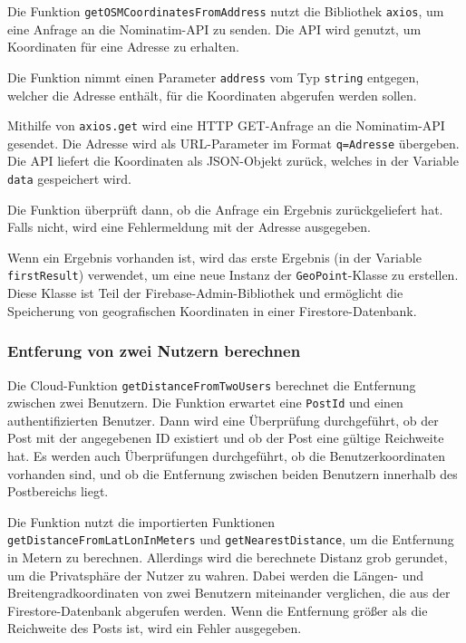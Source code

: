 Die Funktion \texttt{getOSMCoordinatesFromAddress} nutzt die Bibliothek \texttt{axios}, um eine Anfrage an die Nominatim-API zu senden. Die API wird genutzt, um Koordinaten für eine Adresse zu erhalten.

Die Funktion nimmt einen Parameter \texttt{address} vom Typ \texttt{string} entgegen, welcher die Adresse enthält, für die Koordinaten abgerufen werden sollen.

Mithilfe von \texttt{axios.get} wird eine HTTP GET-Anfrage an die Nominatim-API gesendet. Die Adresse wird als URL-Parameter im Format \texttt{q=Adresse} übergeben. Die API liefert die Koordinaten als JSON-Objekt zurück, welches in der Variable \texttt{data} gespeichert wird.

Die Funktion überprüft dann, ob die Anfrage ein Ergebnis zurückgeliefert hat. Falls nicht, wird eine Fehlermeldung mit der Adresse ausgegeben.

Wenn ein Ergebnis vorhanden ist, wird das erste Ergebnis (in der Variable \texttt{firstResult}) verwendet, um eine neue Instanz der \texttt{GeoPoint}-Klasse zu erstellen. Diese Klasse ist Teil der Firebase-Admin-Bibliothek und ermöglicht die Speicherung von geografischen Koordinaten in einer Firestore-Datenbank.

\subsubsection{Entferung von zwei Nutzern berechnen}
Die Cloud-Funktion \texttt{getDistanceFromTwoUsers} berechnet die Entfernung zwischen zwei Benutzern. Die Funktion erwartet eine \texttt{PostId} und einen authentifizierten Benutzer. Dann wird eine Überprüfung durchgeführt, ob der Post mit der angegebenen ID existiert und ob der Post eine gültige Reichweite hat. Es werden auch Überprüfungen durchgeführt, ob die Benutzerkoordinaten vorhanden sind, und ob die Entfernung zwischen beiden Benutzern innerhalb des Postbereichs liegt.

Die Funktion nutzt die importierten Funktionen \texttt{getDistanceFromLatLonInMeters} und \texttt{getNearestDistance}, um die Entfernung in Metern zu berechnen. Allerdings wird die berechnete Distanz grob gerundet, um die Privatsphäre der Nutzer zu wahren. Dabei werden die Längen- und Breitengradkoordinaten von zwei Benutzern miteinander verglichen, die aus der Firestore-Datenbank abgerufen werden. Wenn die Entfernung größer als die Reichweite des Posts ist, wird ein Fehler ausgegeben.


